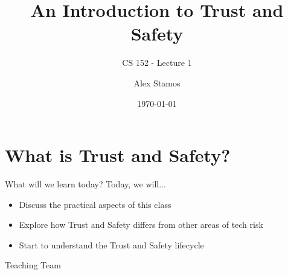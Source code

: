 \documentclass[nobackground,dvipsnames,table]{beamer}
\title{An Introduction to Trust and Safety}
\subtitle{CS 152 - Lecture 1}
\author[A. Stamos]{Alex Stamos}
\institute[SIO]{\large Stanford Internet Observatory}
\date[2022]{\today}
\begin{document}
\coverpage

\begin{frame}
    \titlepage
\end{frame}

\section{What is Trust and Safety?}

\begin{frame}{What will we learn today?}
    Today, we will...
    \begin{itemize}
        \item Discuss the practical aspects of this class
        \item Explore how Trust and Safety differs from other areas of tech risk
        \item Start to understand the Trust and Safety lifecycle
    \end{itemize}
\end{frame}

\begin{frame}{} %
    \thispagestyle{empty}
    \huge
    Teaching Team
\end{frame}
\end{document}
